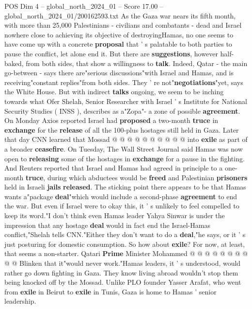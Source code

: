 \begin{textsample}{POS Dim 4 – global\_north\_2024\_01 – Score 17.00 – global\_north\_2024\_01/200162593.txt}  \label{ex:f4_pos_350}
As the Gaza war nears its fifth month, with more than 25,000 Palestinians - civilians and combatants - dead and Israel nowhere close to achieving its objective of destroyingHamas, no one seems to have come up with a concrete \textbf{proposal} that ' s palatable to both parties to pause the conflict, let alone end it.
But there are \textbf{suggestions}, however half-baked, from both sides, that show a willingness to \textbf{talk}.
Indeed, Qatar - the main go-between - says there are"serious discussions"with Israel and Hamas, and is receiving"constant replies"from both sides.
They ' re not"\textbf{negotiations}"yet, says the White House.
But with indirect \textbf{talks} ongoing, we seem to be inching towards what Ofer Shelah, Senior Researcher with Israel ' s Institute for National Security Studies ( INSS ), describes as a"Zopa"- a zone of possible \textbf{agreement}.
On Monday Axios reported Israel had \textbf{proposed} a two-month \textbf{truce} in \textbf{exchange} for the \textbf{release} of all the 100-plus hostages still held in Gaza.
Later that day CNN learned that Mossad @ @ @ @ @ @ @ @ @ @ into \textbf{exile} as part of a broader \textbf{ceasefire}.
On Tuesday, The Wall Street Journal said Hamas was now open to \textbf{releasing} some of the hostages in \textbf{exchange} for a pause in the fighting.
And Reuters reported that Israel and Hamas had agreed in principle to a one-month \textbf{truce}, during which abductees would be \textbf{freed} and Palestinian \textbf{prisoners} held in Israeli \textbf{jails} \textbf{released}.
The sticking point there appears to be that Hamas wants a"package \textbf{deal}"which would include a second-phase \textbf{agreement} to end the war.
But even if Israel were to okay this, it ' s unlikely to feel compelled to keep its word."I don't think even Hamas leader Yahya Sinwar is under the impression that any hostage \textbf{deal} would in fact end the Israel-Hamas conflict,"Shelah tells CNN."Either they don't want to do a \textbf{deal},"he says, or it ' s just posturing for domestic consumption.
So how about \textbf{exile}?
For now, at least, that seems a non-starter.
Qatari \textbf{Prime} Minister Mohammed @ @ @ @ @ @ @ @ @ @ Blinken that it"would never work."Hamas leaders, it ' s understood, would rather go down fighting in Gaza.
They know living abroad wouldn't stop them being knocked off by the Mossad.
Unlike PLO founder Yasser Arafat, who went from \textbf{exile} in Beirut to \textbf{exile} in Tunis, Gaza is home to Hamas ' senior leadership.

\end{textsample}
